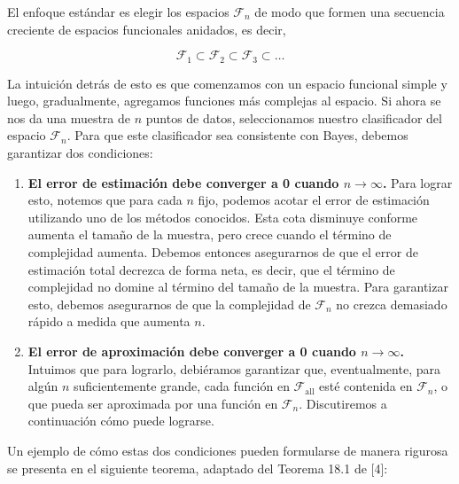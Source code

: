 \documentclass{report}
\begin{document}
El enfoque estándar es elegir los espacios \(\mathcal{F}_n\) de modo que formen una secuencia 
creciente de espacios funcionales anidados, es decir,

\[
\mathcal{F}_1 \subset \mathcal{F}_2 \subset \mathcal{F}_3 \subset \dots
\]

La intuición detrás de esto es que comenzamos con un espacio funcional simple y luego, 
gradualmente, agregamos funciones más complejas al espacio. Si ahora se nos da una muestra 
de \(n\) puntos de datos, seleccionamos nuestro clasificador del espacio \(\mathcal{F}_n\). 
Para que este clasificador sea consistente con Bayes, debemos garantizar dos condiciones:\newline

\begin{enumerate}
    \item \textbf{El error de estimación debe converger a 0 cuando \(n \to \infty\).} Para lograr esto, 
    notemos que para cada \(n\) fijo, podemos acotar el error de estimación utilizando uno de los 
    métodos conocidos. Esta cota disminuye conforme aumenta el tamaño de la muestra, pero 
    crece cuando el término de complejidad aumenta. Debemos entonces asegurarnos de que el error de 
    estimación total decrezca de forma neta, es decir, que el término de complejidad no domine al término 
    del tamaño de la muestra. Para garantizar esto, debemos asegurarnos de que la complejidad de 
    \(\mathcal{F}_n\) no crezca demasiado rápido a medida que aumenta \(n\).

    \item \textbf{El error de aproximación debe converger a 0 cuando \(n \to \infty\).} Intuimos que 
    para lograrlo, 
    debiéramos garantizar que, eventualmente, para algún \(n\) suficientemente grande, cada función en 
    \(\mathcal{F}_{\text{all}}\) esté contenida en \(\mathcal{F}_n\), o que pueda ser aproximada por 
    una función en \(\mathcal{F}_n\). Discutiremos a continuación cómo puede lograrse.
\end{enumerate}


Un ejemplo de cómo estas dos condiciones pueden formularse de manera rigurosa se presenta en el 
siguiente teorema, adaptado del Teorema 18.1 de [4]:\newline
\end{document}
